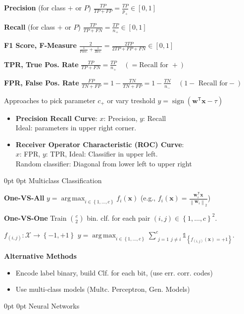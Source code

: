 \documentclass[a4paper,8pt,landscape]{extarticle}
\makeatletter
\newcommand{\cX}{\mathcal{X}}
\newcommand{\set}[1]{\left\{ #1 \right\}}
\newcommand{\norm}[1]{\left\lVert #1 \right\rVert}
\newcommand{\ind}[1]{\mathds{1}_{\set{#1}}}
\newcommand*{\T}{\mathsf{T}}
\DeclareMathOperator{\sign}{sign}
\DeclareMathOperator*{\argmax}{arg\,max}
\renewcommand{\vec}[1]{\mathbf{#1}}
\newcommand{\vw}{\vec{w}}
\newcommand{\vx}{\vec{x}}
\newcommand*{\mybox}[1]{%
    \noindent\colorbox{sectionbarcolor}{%
        \parbox{\dimexpr\columnwidth-2\fboxsep\relax}{%
            \textcolor{white}{#1}}}}
\newcommand*{\mybox}[1]{%
    \noindent\colorbox{sectioncolor}{%
        \parbox{\dimexpr\columnwidth-2\fboxsep\relax}{%
            \textcolor{white}{#1}}}}
\renewcommand\section{\@startsection {section}{1}{\z@}%
                                   {0pt}%
                                   {0pt}%
                                   {\normalfont\bfseries\mybox}}
\makeatother
\begin{document}
\begin{multicols*}{3}
\textbf{Precision} (for class $+$ or $P$)
$
\frac{TP}{TP+FP} = \frac{TP}{p_+} \in [0,1]
$

\textbf{Recall} (for class $+$ or $P$)
$
\frac{TP}{TP+FN} = \frac{TP}{n_+}\in[0,1]
$

\textbf{F1 Score, F-Measure}
$
\frac{2}{\frac{1}{\text{Prec.}}+\frac{1}{Rec.}} =
\frac{2TP}{2TP + FP + FN} \in[0,1]
$

\textbf{TPR, True Pos. Rate}
$
\frac{TP}{TP+FN} = \frac{TP}{n_+}
\quad (=\text{Recall for }+)
$

\textbf{FPR, False Pos. Rate}
$
\frac{FP}{TN+FP}=1-\frac{TN}{TN+FP} = 1-\frac{TN}{n_-}
\quad (1-\text{ Recall for}-)
$

Approaches to pick parameter $c_+$ or vary treshold $y=\sign(\vw^\T\vx -\tau)$
\begin{itemize}
  \item \textbf{Precision Recall Curve}: 
  $x$: Precision, $y$: Recall\\
  Ideal: parameters in upper right corner.
  \item \textbf{Receiver Operator Characteristic (ROC) Curve}:\\
  $x$: FPR, $y$: TPR, Ideal: Classifier in upper left.\\
  Random classifier: Diagonal from lower left to upper right
\end{itemize}

\section{Multiclass Classification}

\textbf{One-VS-All} $y=\argmax_{i\in\set{1,\ldots,c}}f_i(\vx)$
\quad (e.g., $f_i(\vx)=\frac{\vw_i^\T\vx}{\norm{\vw_i}_2}$)

\textbf{One-VS-One} Train $\binom{c}{2}$ bin. clf. for each pair
$(i,j)\in\set{1,\ldots,c}^2$.

$f_{(i,j)}\colon\cX\to\set{-1,+1}$ \quad 
$y=\argmax_{i\in\set{1,\ldots,c}}\sum_{\substack{j=1}{j\neq i}}^{c} 
\ind{f_{(i,j)}(\vx)=+1}$.

\textbf{Alternative Methods}
\begin{itemize}
  \item Encode label binary, build Clf. for each bit, (use err. corr.
  codes)
  \item Use multi-class models (Multc. Perceptron, Gen. Models)
\end{itemize}

\section{Neural Networks}


\end{multicols*}
\end{document}
